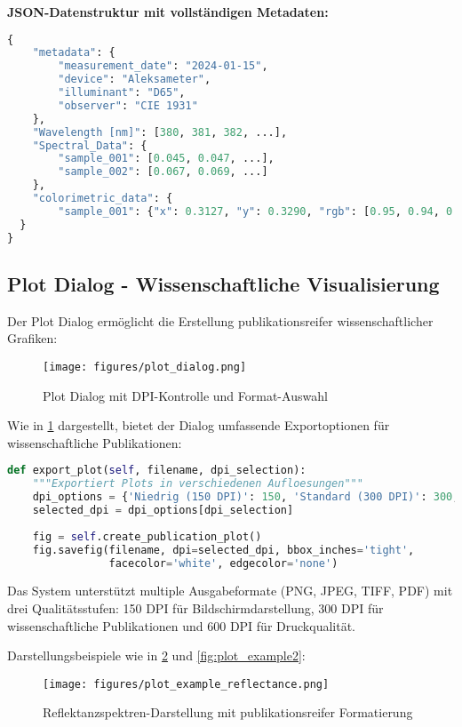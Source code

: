\textbf{JSON-Datenstruktur mit vollständigen Metadaten:}
\begin{lstlisting}[language=Python, caption=JSON-Export Struktur]
{
    "metadata": {
        "measurement_date": "2024-01-15",
        "device": "Aleksameter",
        "illuminant": "D65",
        "observer": "CIE 1931"
    },
    "Wavelength [nm]": [380, 381, 382, ...],
    "Spectral_Data": {
        "sample_001": [0.045, 0.047, ...],
        "sample_002": [0.067, 0.069, ...]
    },
    "colorimetric_data": {
        "sample_001": {"x": 0.3127, "y": 0.3290, "rgb": [0.95, 0.94, 0.93]}
  }
}
\end{lstlisting}

\subsection{Plot Dialog - Wissenschaftliche Visualisierung}

Der Plot Dialog ermöglicht die Erstellung publikationsreifer wissenschaftlicher Grafiken:

\begin{figure}[H]
    \centering
\texttt{[image: figures/plot\_dialog.png]}
\caption{Plot Dialog mit DPI-Kontrolle und Format-Auswahl}
\label{fig:plot_dialog}
\end{figure}

Wie in \ref{fig:plot_dialog} dargestellt, bietet der Dialog umfassende Exportoptionen für wissenschaftliche Publikationen:


\begin{lstlisting}[language=Python, caption=Multi-DPI Plot-Export]
def export_plot(self, filename, dpi_selection):
    """Exportiert Plots in verschiedenen Aufloesungen"""
    dpi_options = {'Niedrig (150 DPI)': 150, 'Standard (300 DPI)': 300, 'Hoch (600 DPI)': 600}
    selected_dpi = dpi_options[dpi_selection]
    
    fig = self.create_publication_plot()
    fig.savefig(filename, dpi=selected_dpi, bbox_inches='tight', 
                facecolor='white', edgecolor='none')
\end{lstlisting}

Das System unterstützt multiple Ausgabeformate (PNG, JPEG, TIFF, PDF) mit drei Qualitätsstufen: 150 DPI für Bildschirmdarstellung, 300 DPI für wissenschaftliche Publikationen und 600 DPI für Druckqualität.

Darstellungsbeispiele wie in \ref{fig:plot_example1} und \ref{fig:plot_example2}:

\begin{figure}[H]
    \centering
\texttt{[image: figures/plot\_example\_reflectance.png]}
\caption{Reflektanzspektren-Darstellung mit publikationsreifer Formatierung}
\label{fig:plot_example1}
\end{figure}

